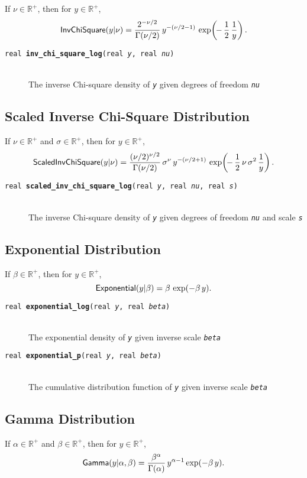 \documentclass[10pt]{report}
\newcommand{\distro}[1]{\mbox{\sf #1}}
\newcommand{\posreals}{\mathbb{R}^+}
\newcommand{\fitem}[4]{\item[{\tt #1 {\bfseries #2}(#3)}]\mbox{ } \\[4pt] #4}
\newcommand{\farg}[1]{{\tt\slshape #1}}
\begin{document}
If $\nu \in \posreals$, then for $y \in \posreals$,
\[
\distro{InvChiSquare}(y|\nu)
= 
\frac{2^{-\nu/2}}
   {\Gamma(\nu / 2)}
\,
y^{-(\nu/2 - 1)}
\,
\exp\! \left( \! - \, \frac{1}{2} \, \frac{1}{y} \right)
.
\]

\begin{description}
\fitem{real}{inv\_chi\_square\_log}{real \farg{y}, real
  \farg{nu}}{The inverse Chi-square density of \farg{y} given
  degrees of freedom \farg{nu}}
\end{description}

\subsection{Scaled Inverse Chi-Square Distribution}

If $\nu \in \posreals$ and $\sigma \in \posreals$, then for $y \in
\posreals$,
\[
\distro{ScaledInvChiSquare}(y|\nu)
= 
\frac{(\nu / 2)^{\nu/2}}
     {\Gamma(\nu / 2)}
\,
\sigma^{\nu}
\,
y^{-(\nu/2 + 1)}
\,
\exp \! \left( \!
   - \, \frac{1}{2} \, \nu \, \sigma^2 \, \frac{1}{y}
\right)
.
\]


\begin{description}
 \fitem{real}{scaled\_inv\_chi\_square\_log}{real \farg{y}, real
   \farg{nu}, real \farg{s}}{The inverse Chi-square density of \farg{y} given
   degrees of freedom \farg{nu} and scale \farg{s}}
\end{description}

\subsection{Exponential Distribution}

If $\beta \in \posreals$, then for $y \in \posreals$,
\[
\distro{Exponential}(y|\beta)
= 
\beta \, 
\exp ( - \beta \, y )
.
\]

\begin{description}
  \fitem{real}{exponential\_log}{real \farg{y}, real \farg{beta}}{The
    exponential density of \farg{y} given inverse scale \farg{beta}}
%
\fitem{real}{exponential\_p}{real \farg{y}, real \farg{beta}}{The
  cumulative distribution function of \farg{y} given inverse scale
  \farg{beta}}
\end{description}

\subsection{Gamma Distribution}

If $\alpha \in \posreals$ and $\beta \in \posreals$, then for $y \in
\posreals$,
\[
\distro{Gamma}(y|\alpha,\beta)
=
\frac{\beta^{\alpha}}
     {\Gamma(\alpha)}
\,
y^{\alpha - 1}
\exp(-\beta \, y)
.
\]
\end{document}
